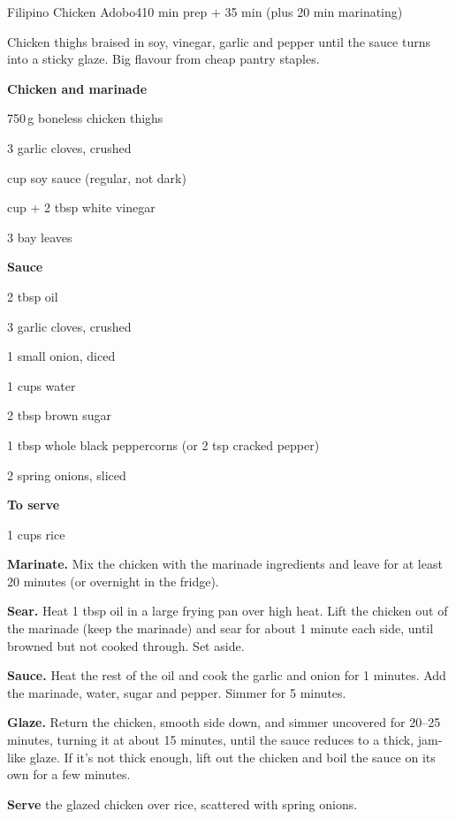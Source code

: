 \begin{recipebox}{Filipino Chicken Adobo}{4}{10 min prep + 35 min (plus 20 min marinating)}

Chicken thighs braised in soy, vinegar, garlic and pepper until the sauce turns
into a sticky glaze. Big flavour from cheap pantry staples.

\begin{ingredients}
  \item[] \textbf{Chicken and marinade}
  \item 750\,g boneless chicken thighs
  \item 3 garlic cloves, crushed
  \item {} cup soy sauce (regular, not dark)
  \item {} cup + 2 tbsp white vinegar
  \item 3 bay leaves
  \item[] \textbf{Sauce}
  \item 2 tbsp oil
  \item 3 garlic cloves, crushed
  \item 1 small onion, diced
  \item 1 cups water
  \item 2 tbsp brown sugar
  \item 1 tbsp whole black peppercorns (or 2 tsp cracked pepper)
  \item 2 spring onions, sliced
  \item[] \textbf{To serve}
  \item 1 cups rice
\end{ingredients}

\begin{method}
  \item \textbf{Marinate.} Mix the chicken with the marinade ingredients and leave
        for at least 20 minutes (or overnight in the fridge).
  \item \textbf{Sear.} Heat 1 tbsp oil in a large frying pan over high heat. Lift the
        chicken out of the marinade (keep the marinade) and sear for about 1 minute
        each side, until browned but not cooked through. Set aside.
  \item \textbf{Sauce.} Heat the rest of the oil and cook the garlic and onion for
        1 minutes. Add the marinade, water, sugar and pepper. Simmer
        for 5 minutes.
  \item \textbf{Glaze.} Return the chicken, smooth side down, and simmer uncovered for
        20--25 minutes, turning it at about 15 minutes, until the sauce reduces to a
        thick, jam-like glaze. If it's not thick enough, lift out the chicken and
        boil the sauce on its own for a few minutes.
  \item \textbf{Serve} the glazed chicken over rice, scattered with spring onions.
\end{method}


\end{recipebox}
